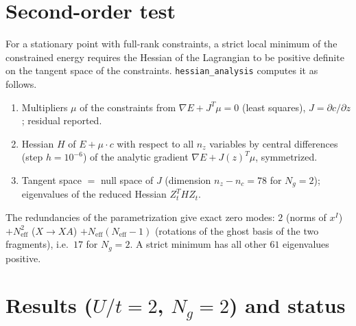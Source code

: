 \documentclass[11pt]{article}
\newcommand{\Neff}{N_{\mathrm{eff}}}
\newcommand{\Ng}{N_{g}}
\begin{document}
\section{Second-order test}
\label{sec:hessian}

For a stationary point with full-rank constraints, a strict local minimum of the
constrained energy requires the Hessian of the Lagrangian to be positive definite on the
tangent space of the constraints. \texttt{hessian\_analysis} computes it as follows.
\begin{enumerate}
  \item Multipliers $\mu$ of the constraints from $\nabla E+J^{T}\mu=0$ (least squares),
    $J=\partial c/\partial z$; residual reported.
  \item Hessian $H$ of $E+\mu\!\cdot\!c$ with respect to all $n_z$ variables by central
    differences (step $h=10^{-6}$) of the analytic gradient $\nabla E+J(z)^T\mu$, symmetrized.
  \item Tangent space $=$ null space of $J$ (dimension $n_z-n_c=78$ for $\Ng=2$);
    eigenvalues of the reduced Hessian $Z_t^{T}HZ_t$.
\end{enumerate}
The redundancies of the parametrization give exact zero modes: $2$ (norms of $x^I$)
$+\Neff^2$ ($X\to XA$) $+\Neff(\Neff-1)$ (rotations of the ghost basis of the two
fragments), i.e.\ $17$ for $\Ng=2$. A strict minimum has all other $61$ eigenvalues positive.

\section{Results ($U/t=2$, $\Ng=2$) and status}
\label{sec:results}
\end{document}
